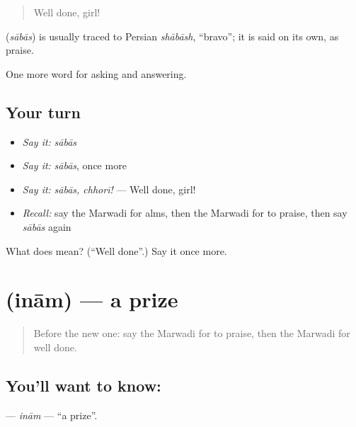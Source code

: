 \begin{quote}
Well done, girl!
\end{quote}

\begin{cousinweb}
\textbf{} (\emph{sābās}) is usually traced to Persian \emph{shābāsh}, \textquotedblleft{}bravo\textquotedblright{}; it is said on its own, as praise.
\end{cousinweb}

\begin{grammarlens}[title={What you've built}]
One more word for asking and answering.
\end{grammarlens}

\subsection*{Your turn}
\begin{itemize}
\raggedright
  \item \emph{Say it:} \emph{sābās}
  \item \emph{Say it:} \emph{sābās}, once more
  \item \emph{Say it:} \emph{sābās, chhorī!} — Well done, girl!
  \item \emph{Recall:} say the Marwadi for alms, then the Marwadi for to praise, then say \emph{sābās} again
\end{itemize}

\begin{tcolorbox}[breakable,colback=teal!4,colframe=teal!35!black,title={Before you move on}]
What does  mean? (\textquotedblleft{}Well done\textquotedblright{}.) Say it once more.
\end{tcolorbox}
\section[\texorpdfstring{\mw{इनाम} (inām)}{इनाम (inām)}]{ (inām) — a prize}

\label{lesson:MW-C275-inam}



\begin{quote}
Before the new one: say the Marwadi for to praise, then the Marwadi for well done.
\end{quote}

\subsection*{You'll want to know: }
\textbf{} — \emph{inām} — \textquotedblleft{}a prize\textquotedblright{}.

